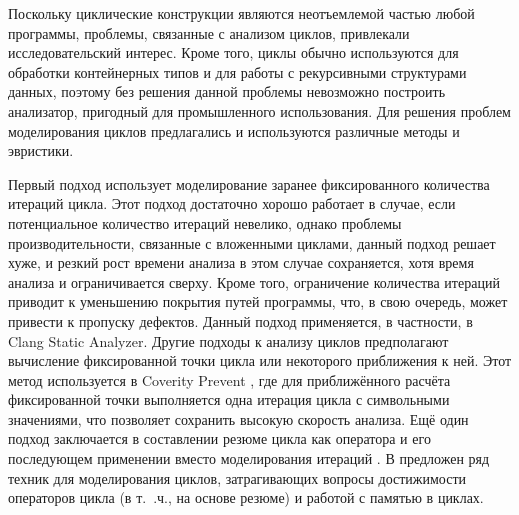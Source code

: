 Поскольку циклические конструкции являются неотъемлемой частью любой программы, проблемы, связанные с анализом циклов, привлекали исследовательский интерес. Кроме того, циклы обычно используются для обработки контейнерных типов и для работы с рекурсивными структурами данных, поэтому без решения данной проблемы невозможно построить анализатор, пригодный для промышленного использования. Для решения проблем моделирования циклов предлагались и используются различные методы и эвристики. 

Первый подход использует моделирование заранее фиксированного количества итераций цикла. Этот подход достаточно хорошо работает в случае, если потенциальное количество итераций невелико, однако проблемы производительности, связанные с вложенными циклами, данный подход решает хуже, и резкий рост времени анализа в этом случае сохраняется, хотя время анализа и ограничивается сверху. Кроме того, ограничение количества итераций приводит к уменьшению покрытия путей программы, что, в свою очередь, может привести к пропуску дефектов. Данный подход применяется, в частности, в Clang Static Analyzer. Другие подходы к анализу циклов предполагают вычисление фиксированной точки цикла или некоторого приближения к ней. Этот метод используется в Coverity Prevent \cite{coverity-checker-doc}, где для приближённого расчёта фиксированной точки выполняется одна итерация цикла с символьными значениями, что позволяет сохранить высокую скорость анализа. Ещё один подход заключается в составлении резюме цикла как оператора и его последующем применении вместо моделирования итераций \cite{loopfrog-summary, godefroid-loop-summary}. В \cite{trtik-thesis} предложен ряд техник для моделирования циклов, затрагивающих вопросы достижимости операторов цикла (в т.~.ч., на основе резюме) и работой с памятью в циклах.

